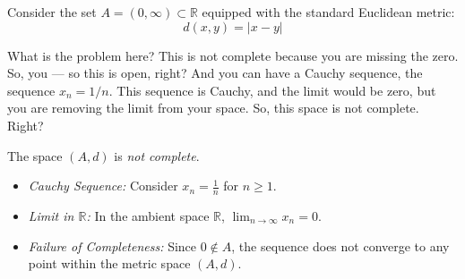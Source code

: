 \begin{math-stroke}
Consider the set $A = (0, \infty) \subset \mathbb{R}$ equipped with the standard Euclidean metric:
\[ d(x, y) = |x - y| \]
\begin{center}
\end{center}
\end{math-stroke}

\begin{spoken-clean}[00:05:24 - 00:06:15]
What is the problem here? This is not complete because you are missing the zero. So, you --- so this is open, right? And you can have a Cauchy sequence, the sequence $x_n = 1/n$.  This sequence is Cauchy, and the limit would be zero, but you are removing the limit from your space. So, this space is not complete. Right?
\end{spoken-clean}

\begin{math-stroke}
The space $(A, d)$ is \emph{not complete}.
\begin{itemize}
    \setcounter{enumi}{0} \item \emph{Cauchy Sequence:} Consider $x_n = \frac{1}{n}$ for $n \ge 1$.
    \setcounter{enumi}{1} \item \emph{Limit in $\mathbb{R}$:} In the ambient space $\mathbb{R}$, $\lim_{n \to \infty} x_n = 0$.
    \setcounter{enumi}{2} \item \emph{Failure of Completeness:} Since $0 \notin A$, the sequence does not converge to any point within the metric space $(A, d)$.
\end{itemize}
\end{math-stroke}

